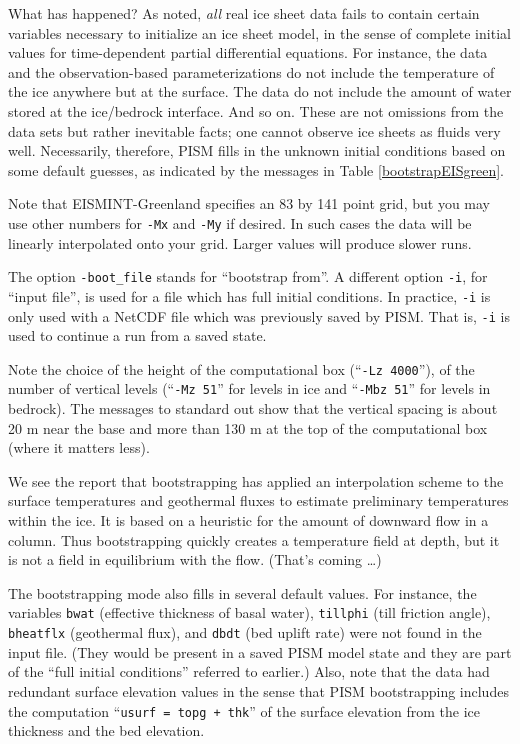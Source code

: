 What has happened?  As noted, \emph{all} real ice sheet data fails to contain certain variables necessary to initialize an ice sheet model, in the sense of complete initial values for time-dependent partial differential equations.  For instance, the data and the observation-based parameterizations do not include the temperature of the ice anywhere but at the surface.  The data do not include the amount of water stored at the ice/bedrock interface.  And so on.  These are not omissions from the data sets but rather inevitable facts; one cannot observe ice sheets as fluids very well.  Necessarily, therefore, PISM fills in the unknown initial conditions based on some default guesses, as indicated by the messages in Table \ref{bootstrapEISgreen}.

Note that EISMINT-Greenland specifies an 83 by 141 point grid, but you may use other numbers for \texttt{-Mx} and \texttt{-My} if desired.  In such cases the data will be linearly interpolated onto your grid.  Larger values will produce slower runs.

The option \texttt{-boot_file} stands for ``bootstrap from''.  A different option \texttt{-i}, for ``input file'', is used for a file which has full initial conditions.  In practice, \texttt{-i} is only used with a NetCDF file which was previously saved by PISM.  That is, \texttt{-i} is used to continue a run from a saved state.

Note the choice of the height of the computational box (``\texttt{-Lz 4000}''), of the number of vertical levels (``\texttt{-Mz 51}'' for levels in ice and ``\texttt{-Mbz 51}'' for levels in bedrock). The messages to standard out show that the vertical spacing is about 20 m near the base and more than 130 m at the top of the computational box (where it matters less).

We see the report that bootstrapping has applied an interpolation scheme to the surface temperatures and geothermal fluxes to estimate preliminary temperatures within the ice.  It is based on a heuristic for the amount of downward flow in a column.  Thus bootstrapping quickly creates a temperature field at depth, but it is not a field in equilibrium with the flow.  (That's coming \dots)

The bootstrapping mode also fills in several default values.  For instance, the variables \texttt{bwat} (effective thickness of basal water), \texttt{tillphi} (till friction angle), \texttt{bheatflx} (geothermal flux), and \texttt{dbdt} (bed uplift rate) were not found in the input file.   (They would be present in a saved PISM model state and they are part of the ``full initial conditions'' referred to earlier.)  Also, note that the data had redundant surface elevation values in the sense that PISM bootstrapping includes the computation ``\texttt{usurf = topg + thk}'' of the surface elevation from the ice thickness and the bed elevation.

